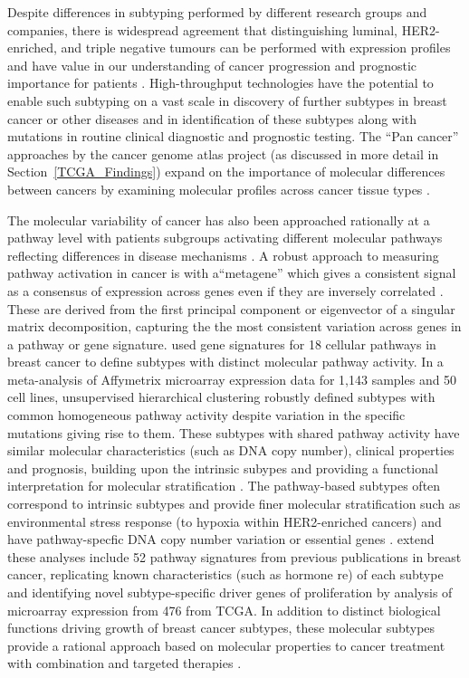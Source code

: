 Despite differences in subtyping performed by different research groups and companies, there is widespread agreement that distinguishing luminal, HER2-enriched, and triple negative tumours can be performed with expression profiles and have value in our understanding of cancer progression and prognostic importance for patients \citet{Dai2015}. High-throughput technologies have the potential to enable such subtyping on a vast scale in discovery of further subtypes in breast cancer or other diseases and in identification of these subtypes along with mutations in routine clinical diagnostic and prognostic testing. The ``Pan cancer'' approaches by the cancer genome atlas project (as discussed in more detail in Section~\ref{TCGA_Findings}) expand on the importance of molecular differences between cancers by examining molecular profiles across cancer tissue types \citep{TCGA2013PAN}.

The molecular variability of cancer has also been approached rationally at a pathway level with patients subgroups activating different molecular pathways reflecting differences in disease mechanisms \citep{Gatza2010}. A robust approach to measuring pathway activation in cancer is with a``metagene'' which gives a consistent signal as a consensus of expression across genes even if they are inversely correlated \citep{Huang2003, Anjomshoaa2008, Nagalla2013}. These are derived from the first principal component or eigenvector of a singular matrix decomposition, capturing the the most consistent variation across genes in a pathway or gene signature. \citet{Gatza2010} used gene signatures for 18 cellular pathways in breast cancer to define subtypes with distinct molecular pathway activity. In a meta-analysis of Affymetrix microarray expression data for 1,143 samples and 50 cell lines, unsupervised hierarchical clustering robustly defined subtypes with common homogeneous pathway activity despite variation in the specific mutations giving rise to them. These subtypes with shared pathway activity have similar molecular characteristics (such as DNA copy number), clinical properties and prognosis, building upon the intrinsic subypes \citep{Parker2009} and providing a functional interpretation for molecular stratification \citep{Gatza2010}. The pathway-based subtypes often correspond to intrinsic subtypes \citep{Gatza2010, Gatza2014} and provide finer molecular stratification such as environmental stress response (to hypoxia within HER2-enriched cancers) \citep{Gatza2011} and have pathway-specfic DNA copy number variation or essential genes \citep{Gatza2014}. \citet{Gatza2014} extend these analyses include 52 pathway signatures from previous publications in breast cancer, replicating known characteristics (such as hormone re) of each subtype and identifying novel subtype-specific driver genes of proliferation by analysis of microarray expression from 476 from \gls{TCGA}. In addition to distinct biological functions driving growth of breast cancer subtypes, these molecular subtypes provide a rational approach based on molecular properties to cancer treatment with combination and targeted therapies  \citep{Hanahan2000, Gatza2010, Gatza2014}.


